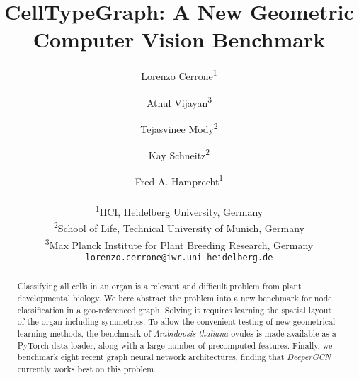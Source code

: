 \documentclass[10pt,twocolumn,letterpaper]{article}
\begin{document}
\title{CellTypeGraph: A New Geometric Computer Vision Benchmark}

\author{
Lorenzo Cerrone\textsuperscript{\rm 1}\\
\and 
Athul Vijayan\textsuperscript{\rm 3}\\
\and
Tejasvinee Mody\textsuperscript{\rm 2}\\
\and
Kay Schneitz\textsuperscript{\rm 2}\\
\and
Fred A. Hamprecht\textsuperscript{\rm 1}\\
\\
\textsuperscript{\rm 1}HCI, Heidelberg University, Germany\\
\textsuperscript{\rm 2}School of Life, Technical University of Munich, Germany\\
\textsuperscript{\rm 3}Max Planck Institute for Plant Breeding Research, Germany\\
{\tt\small lorenzo.cerrone@iwr.uni-heidelberg.de}\\
}
\maketitle

\begin{abstract}
Classifying all cells in an organ is a relevant and difficult problem from plant developmental biology. We here abstract the problem into a new benchmark for node classification in a geo-referenced graph. Solving it requires learning the spatial layout of the organ including symmetries. 
To allow the convenient testing of new geometrical learning methods, the benchmark of \textit{Arabidopsis thaliana} ovules is made available as a  PyTorch data loader, along with a large number of precomputed features. Finally, we benchmark eight recent graph neural network architectures, finding that \textit{DeeperGCN} currently works best on this problem.
\end{abstract}
\end{document}
